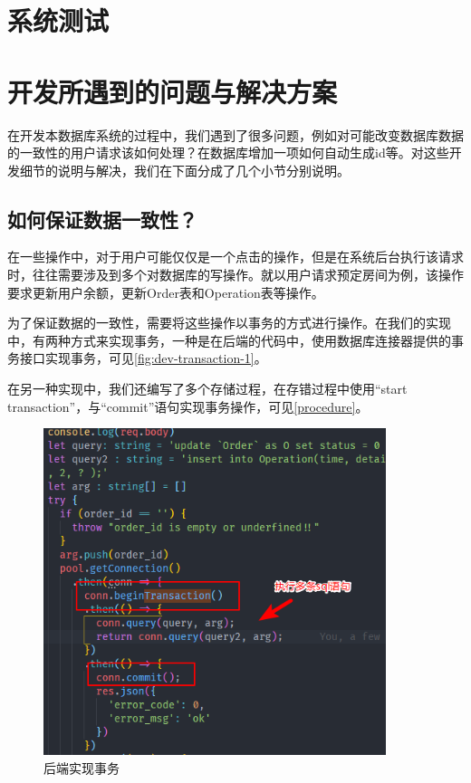 \documentclass{myreport}
\begin{document}
\chapter{系统测试}




\chapter{开发所遇到的问题与解决方案}


在开发本数据库系统的过程中，我们遇到了很多问题，例如对可能改变数据库数据的一致性的用户请求该如何处理？在数据库增加一项如何自动生成id等。对这些开发细节的说明与解决，我们在下面分成了几个小节分别说明。

\section{如何保证数据一致性？}

在一些操作中，对于用户可能仅仅是一个点击的操作，但是在系统后台执行该请求时，往往需要涉及到多个对数据库的写操作。就以用户请求预定房间为例，该操作要求更新用户余额，更新Order表和Operation表等操作。

为了保证数据的一致性，需要将这些操作以事务的方式进行操作。在我们的实现中，有两种方式来实现事务，一种是在后端的代码中，使用数据库连接器提供的事务接口实现事务，可见\autoref{fig:dev-transaction-1}。

在另一种实现中，我们还编写了多个存储过程，在存错过程中使用“start transaction”，与“commit”语句实现事务操作，可见\autoref{procedure}。


\begin{figure}[htp]
    \centering
    \includegraphics[width=10cm]{figure/2018-12-22-12-35-08.png}
    \caption{后端实现事务}
    \label{fig:dev-transaction-1}
\end{figure}
\end{document}
